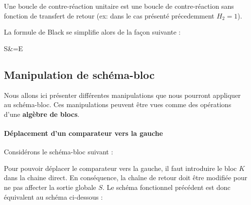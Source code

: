 Une boucle de contre-réaction unitaire est une boucle de contre-réaction sans 
fonction de transfert de retour (ex: dans le cas présenté précedemment $H_2=1$).

\begin{center}
    
\end{center}

La formule de Black se simplifie alors de la façon suivante :
\begin{bequation}
    S&=E
\end{bequation}

\subsection{Manipulation de schéma-bloc}
Nous allons ici présenter différentes manipulations que nous
pourront appliquer au schéma-bloc. Ces manipulations peuvent
être vues comme des opérations d'une \textbf{algèbre de blocs}.

\paragraph{Déplacement d'un comparateur vers la gauche}

Considérons le schéma-bloc suivant :
\begin{center}
    
\end{center}

Pour pouvoir déplacer le comparateur vers la gauche, 
il faut introduire le bloc $K$ dans la chaine direct.
En conséquence, la chaîne de retour doit être modifiée pour ne pas affecter 
la sortie globale $S$. Le schéma fonctionnel précédent est donc équivalent 
au schéma ci-dessous :

\begin{center}
    
\end{center}


